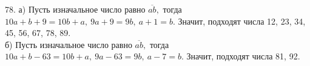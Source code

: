 78. а) Пусть изначальное число равно $\overline{ab},$ тогда $10a+b+9=10b+a,\ 9a+9=9b,\ a+1=b.$ Значит, подходят числа 12, 23, 34, 45, 56, 67, 78, 89.\\
б) Пусть изначальное число равно $\overline{ab},$ тогда $10a+b-63=10b+a,\ 9a-63=9b,\ a-7=b.$ Значит, подходят числа 81, 92.\\
